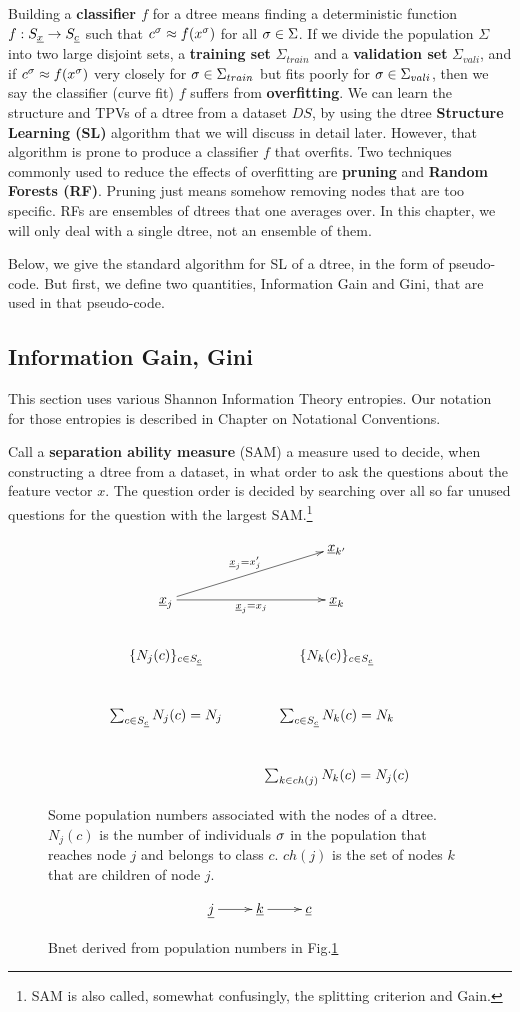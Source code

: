 Building a {\bf classifier $f$} for a dtree means
finding a deterministic
function $f:S_{\underline{x}}\rightarrow S_{\underline{c}}$ 
such that 
$c^\sigma \approx f(x^\sigma)$
for all $\sigma\in \Sigma$.
If we divide
the population
$\Sigma$ 
into two large 
disjoint
sets, a {\bf training set} $\Sigma_{train}$
and a {\bf validation set} $\Sigma_{vali}$,
and if $c^\sigma \approx f(x^\sigma)$ very closely
for $\sigma\in \Sigma_{train}$
but fits poorly
for $\sigma\in \Sigma_{vali}$,
then we say the classifier (curve fit) $f$
suffers from {\bf overfitting}.
We can learn the structure
and TPVs of a dtree from a dataset $DS$,
by using the
dtree {\bf Structure Learning (SL)}
algorithm that we will 
discuss in detail later. However,
that algorithm
is prone to produce
a classifier $f$ that overfits.
Two techniques 
commonly used to 
reduce the effects of overfitting
are {\bf pruning}  and 
{\bf Random Forests (RF)}.
Pruning just means somehow
removing nodes that are
too specific. 
RFs are ensembles of dtrees 
that one averages over.
In this chapter, we will only deal
with a single dtree,
not an ensemble of them. 


Below,
we give the standard
algorithm for SL
of a dtree, in the form
of pseudo-code.
But first,
we define
two quantities,
Information Gain and
Gini,
that are 
used in that 
pseudo-code.



\subsection{Information Gain, Gini}
This section uses various Shannon Information Theory
entropies. Our 
notation for those
entropies
is described in Chapter 
on Notational Conventions.


Call a {\bf separation ability measure} (SAM)
a measure used 
to decide, when 
constructing a dtree from a dataset,
in what order 
to ask the questions
about the feature vector $x$.
The question order is decided
by searching 
over all so far unused questions
for the question with 
the largest SAM.\footnote{SAM
is also called, somewhat
confusingly, the splitting
criterion and Gain.}



\begin{figure}[h!]
$$
\xymatrix{
&\rvx_{k'}
\\
\rvx_j\ar[r]_{\rvx_j=x_j}
\ar[ru]^{\rvx_j=x_j'}&\rvx_k
\\
\{N_j(c)\}_{c\in S_\rvc}
&
\{N_k(c)\}_{c\in S_\rvc}
\\
\sum_{c\in S_\rvc}N_j(c)=N_j
&
\sum_{c\in S_\rvc}N_k(c)=N_k
\\
&
\sum_{k\in ch(j)}N_k(c)=N_j(c)
}
$$
\caption{
Some population numbers associated
with the nodes of a dtree. $N_j(c)$ is the number
of individuals $\sigma$
in the population that reaches node $j$
and belongs to class $c$. 
$ch(j)$ is the set of nodes $k$ that are
children of node $j$.} 
\label{fig-dtree-notation}
\end{figure}
\begin{figure}[h!]
$$
\xymatrix{
\rvj
\ar[r]
&
\rvk\ar[r]
&
\rvc
}$$
\caption{Bnet derived from population
numbers in Fig.\ref{fig-dtree-notation}}
\label{fig-class-bnet}
\end{figure}



